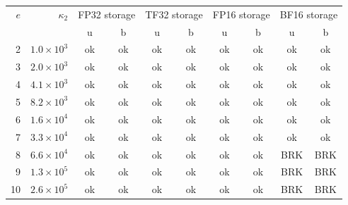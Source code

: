 \begin{tabular}{rr|cc|cc|cc|cc}
\toprule
$e$ & $\kappa_2$ & \multicolumn{2}{c|}{FP32 storage} & \multicolumn{2}{c|}{TF32 storage} & \multicolumn{2}{c|}{FP16 storage} & \multicolumn{2}{c}{BF16 storage}\\
 &  & u & b & u & b & u & b & u & b\\
\midrule
2 & $1.0\!\times\!10^{3}$ & \cellcolor{green!15}ok & \cellcolor{green!15}ok & \cellcolor{green!15}ok & \cellcolor{green!15}ok & \cellcolor{green!15}ok & \cellcolor{green!15}ok & \cellcolor{green!15}ok & \cellcolor{green!15}ok\\
3 & $2.0\!\times\!10^{3}$ & \cellcolor{green!15}ok & \cellcolor{green!15}ok & \cellcolor{green!15}ok & \cellcolor{green!15}ok & \cellcolor{green!15}ok & \cellcolor{green!15}ok & \cellcolor{green!15}ok & \cellcolor{green!15}ok\\
4 & $4.1\!\times\!10^{3}$ & \cellcolor{green!15}ok & \cellcolor{green!15}ok & \cellcolor{green!15}ok & \cellcolor{green!15}ok & \cellcolor{green!15}ok & \cellcolor{green!15}ok & \cellcolor{green!15}ok & \cellcolor{green!15}ok\\
5 & $8.2\!\times\!10^{3}$ & \cellcolor{green!15}ok & \cellcolor{green!15}ok & \cellcolor{green!15}ok & \cellcolor{green!15}ok & \cellcolor{green!15}ok & \cellcolor{green!15}ok & \cellcolor{green!15}ok & \cellcolor{green!15}ok\\
6 & $1.6\!\times\!10^{4}$ & \cellcolor{green!15}ok & \cellcolor{green!15}ok & \cellcolor{green!15}ok & \cellcolor{green!15}ok & \cellcolor{green!15}ok & \cellcolor{green!15}ok & \cellcolor{green!15}ok & \cellcolor{green!15}ok\\
7 & $3.3\!\times\!10^{4}$ & \cellcolor{green!15}ok & \cellcolor{green!15}ok & \cellcolor{green!15}ok & \cellcolor{green!15}ok & \cellcolor{green!15}ok & \cellcolor{green!15}ok & \cellcolor{green!15}ok & \cellcolor{green!15}ok\\
8 & $6.6\!\times\!10^{4}$ & \cellcolor{green!15}ok & \cellcolor{green!15}ok & \cellcolor{green!15}ok & \cellcolor{green!15}ok & \cellcolor{green!15}ok & \cellcolor{green!15}ok & \cellcolor{red!25}BRK & \cellcolor{red!25}BRK\\
9 & $1.3\!\times\!10^{5}$ & \cellcolor{green!15}ok & \cellcolor{green!15}ok & \cellcolor{green!15}ok & \cellcolor{green!15}ok & \cellcolor{green!15}ok & \cellcolor{green!15}ok & \cellcolor{red!25}BRK & \cellcolor{red!25}BRK\\
10 & $2.6\!\times\!10^{5}$ & \cellcolor{green!15}ok & \cellcolor{green!15}ok & \cellcolor{green!15}ok & \cellcolor{green!15}ok & \cellcolor{green!15}ok & \cellcolor{green!15}ok & \cellcolor{red!25}BRK & \cellcolor{red!25}BRK\\

\end{tabular}
